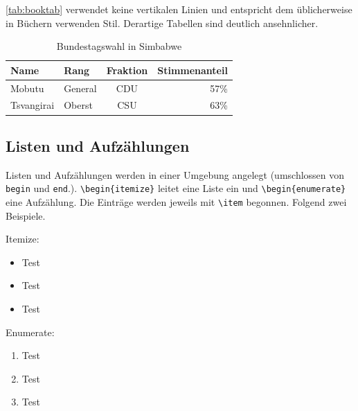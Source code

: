 \autoref{tab:booktab} verwendet keine vertikalen Linien und entspricht dem üblicherweise in Büchern verwenden Stil. Derartige Tabellen sind deutlich ansehnlicher.

\begin{table}[h]
\centering
\begin{tabular} {llcr}
	\toprule
	Name & Rang & Fraktion & Stimmenanteil \\
	\midrule
	Mobutu & General & CDU & 57\% \\
	Tsvangirai & Oberst & CSU & 63\% \\
	\bottomrule
\end{tabular}
\caption {Bundestagswahl in Simbabwe}
\label{tab:booktab}
\end{table}

\subsection{Listen und Aufzählungen}

Listen und Aufzählungen werden in einer Umgebung angelegt (umschlossen von \verb|begin| und \verb|end|.). \verb|\begin{itemize}| leitet eine Liste ein und \verb|\begin{enumerate}| eine Aufzählung. Die Einträge werden jeweils mit \verb|\item| begonnen. Folgend zwei Beispiele.

Itemize:
\begin{itemize}
\item Test
\item Test
\item Test
\end{itemize}

Enumerate:
\begin{enumerate}
\item Test
\item Test
\item Test
\end{enumerate}